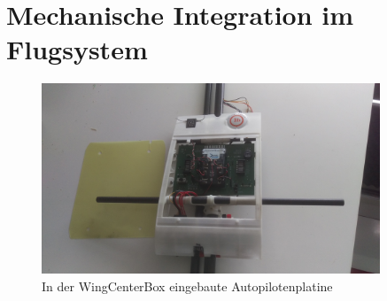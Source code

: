 \section{Mechanische Integration im Flugsystem}

\begin{figure}[H]
\centering
\includegraphics[width=0.9\textwidth]{bilder/Fotos/AUVSI_2016_Centerbox_Detail.jpg} 
\caption{In der WingCenterBox eingebaute Autopilotenplatine} 
\label{fig:In der WingCenterBox eingebaute Autopilotenplatine}
\end{figure}
